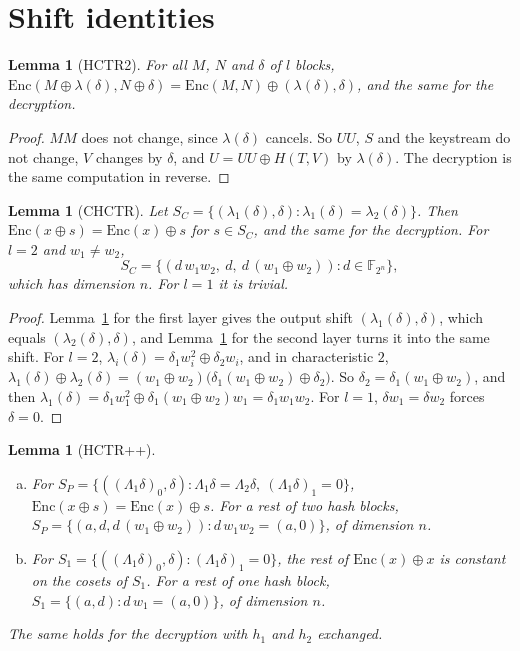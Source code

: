 \documentclass[11pt]{article}
\newtheorem{lemma}[theorem]{Lemma}
\theoremstyle{definition}
\theoremstyle{remark}
\newcommand{\F}{\mathbb{F}}
\newcommand{\Enc}{\mathrm{Enc}}
\begin{document}
\section{Shift identities}\label{sec:shift}

\begin{lemma}[HCTR2]\label{lem:hctr2}
For all $M$, $N$ and $\delta$ of $l$ blocks, $\Enc(M\oplus\lambda(\delta),N\oplus\delta)=\Enc(M,N)\oplus(\lambda(\delta),\delta)$, and the same for the decryption.
\end{lemma}

\begin{proof}
$MM$ does not change, since $\lambda(\delta)$ cancels. So $UU$, $S$ and the keystream do not change, $V$ changes by $\delta$, and $U=UU\oplus H(T,V)$ by $\lambda(\delta)$. The decryption is the same computation in reverse.
\end{proof}

\begin{lemma}[CHCTR]\label{lem:chctr}
Let $S_C=\{(\lambda_1(\delta),\delta):\lambda_1(\delta)=\lambda_2(\delta)\}$. Then $\Enc(x\oplus s)=\Enc(x)\oplus s$ for $s\in S_C$, and the same for the decryption. For $l=2$ and $w_1\ne w_2$,
\[
S_C=\{(d\,w_1w_2,\ d,\ d\,(w_1\oplus w_2)) : d\in\F_{2^n}\},
\]
which has dimension $n$. For $l=1$ it is trivial.
\end{lemma}

\begin{proof}
Lemma~\ref{lem:hctr2} for the first layer gives the output shift $(\lambda_1(\delta),\delta)$, which equals $(\lambda_2(\delta),\delta)$, and Lemma~\ref{lem:hctr2} for the second layer turns it into the same shift. For $l=2$, $\lambda_i(\delta)=\delta_1w_i^2\oplus\delta_2w_i$, and in characteristic $2$,
$\lambda_1(\delta)\oplus\lambda_2(\delta)=(w_1\oplus w_2)\bigl(\delta_1(w_1\oplus w_2)\oplus\delta_2\bigr)$. So $\delta_2=\delta_1(w_1\oplus w_2)$, and then $\lambda_1(\delta)=\delta_1w_1^2\oplus\delta_1(w_1\oplus w_2)w_1=\delta_1w_1w_2$. For $l=1$, $\delta w_1=\delta w_2$ forces $\delta=0$.
\end{proof}

\begin{lemma}[HCTR++]\label{lem:hctrpp}
\begin{enumerate}[(a)]
\item For $S_P=\{((\Lambda_1\delta)_0,\delta):\Lambda_1\delta=\Lambda_2\delta,\ (\Lambda_1\delta)_1=0\}$, $\Enc(x\oplus s)=\Enc(x)\oplus s$. For a rest of two hash blocks, $S_P=\{(a,d,d\,(w_1\oplus w_2)) : d\,w_1w_2=(a,0)\}$, of dimension $n$.
\item For $S_1=\{((\Lambda_1\delta)_0,\delta):(\Lambda_1\delta)_1=0\}$, the rest of $\Enc(x)\oplus x$ is constant on the cosets of $S_1$. For a rest of one hash block, $S_1=\{(a,d):d\,w_1=(a,0)\}$, of dimension $n$.
\end{enumerate}
The same holds for the decryption with $h_1$ and $h_2$ exchanged.
\end{lemma}
\end{document}
